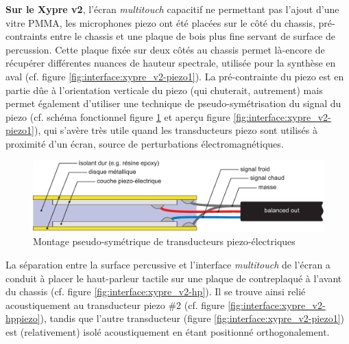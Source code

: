 \indent \textbf{Sur le Xypre v2}, l'écran \textit{multitouch} capacitif ne permettant pas l'ajout d'une vitre \gls{PMMA}, les microphones piezo ont été placées sur le côté du chassis, pré-contraints entre le chassis et une plaque de bois plus fine servant de surface de percussion. Cette plaque fixée sur deux côtés au chassis permet là-encore de récupérer différentes nuances de hauteur spectrale, utilisée pour la synthèse en aval (cf. figure \ref{fig:interface:xypre_v2-piezo1}). La pré-contrainte du piezo est en partie dûe à l'orientation verticale du piezo (qui chuterait, autrement) mais permet également d'utiliser une technique de pseudo-symétrisation du signal du piezo (cf. schéma fonctionnel figure \ref{fig:interface:balancedPiezo} et aperçu figure \ref{fig:interface:xypre_v2-piezo1}), qui s'avère très utile quand les transducteurs piezo sont utilisés à proximité d'un écran, source de perturbations électromagnétiques.\\
\begin{figure}[!htbp]
	\captionsetup{format=plain}%
	\includegraphics[width=\textwidth]{gfx/05_interfaces/balancedPiezo.pdf}
	\caption{Montage pseudo-symétrique de transducteurs piezo-électriques}
	\label{fig:interface:balancedPiezo}
\end{figure}
\indent La séparation entre la surface percussive et l'interface \textit{multitouch} de l'écran a conduit à placer le haut-parleur tactile sur une plaque de contreplaqué à l'avant du chassis (cf. figure \ref{fig:interface:xypre_v2-hp}). Il se trouve ainsi relié acoustiquement au transducteur piezo \#2 (cf. figure \ref{fig:interface:xypre_v2-hppiezo}), tandis que l'autre transducteur (figure \ref{fig:interface:xypre_v2-piezo1}) est (relativement) isolé acoustiquement en étant positionné orthogonalement.

